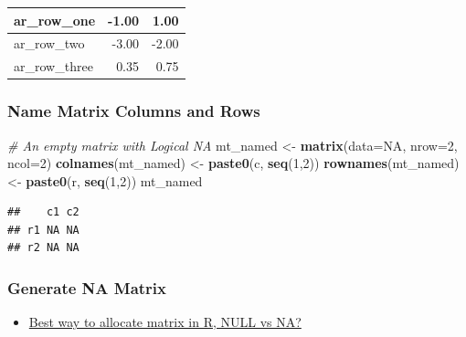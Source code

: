 \documentclass[
]{book}
\newenvironment{Shaded}{\begin{snugshade}}{\end{snugshade}}
\newcommand{\CommentTok}[1]{\textcolor[rgb]{0.56,0.35,0.01}{\textit{#1}}}
\newcommand{\DataTypeTok}[1]{\textcolor[rgb]{0.13,0.29,0.53}{#1}}
\newcommand{\DecValTok}[1]{\textcolor[rgb]{0.00,0.00,0.81}{#1}}
\newcommand{\KeywordTok}[1]{\textcolor[rgb]{0.13,0.29,0.53}{\textbf{#1}}}
\newcommand{\NormalTok}[1]{#1}
\newcommand{\OtherTok}[1]{\textcolor[rgb]{0.56,0.35,0.01}{#1}}
\newcommand{\StringTok}[1]{\textcolor[rgb]{0.31,0.60,0.02}{#1}}
\providecommand{\tightlist}{%
  \setlength{\itemsep}{0pt}\setlength{\parskip}{0pt}}
\begin{document}
\begin{table}[!h]
\centering
\begin{tabular}{l|r|r}
\hline
ar\_row\_one & -1.00 & 1.00\\
\hline
\rowcolor{gray!6}  ar\_row\_two & -3.00 & -2.00\\
\hline
ar\_row\_three & 0.35 & 0.75\\
\hline
\end{tabular}
\end{table}

\hypertarget{name-matrix-columns-and-rows}{%
\subsubsection{Name Matrix Columns and Rows}\label{name-matrix-columns-and-rows}}

\begin{Shaded}
\begin{Highlighting}[]
\CommentTok{\# An empty matrix with Logical NA}
\NormalTok{mt\_named \textless{}{-}}\StringTok{ }\KeywordTok{matrix}\NormalTok{(}\DataTypeTok{data=}\OtherTok{NA}\NormalTok{, }\DataTypeTok{nrow=}\DecValTok{2}\NormalTok{, }\DataTypeTok{ncol=}\DecValTok{2}\NormalTok{)}
\KeywordTok{colnames}\NormalTok{(mt\_named) \textless{}{-}}\StringTok{ }\KeywordTok{paste0}\NormalTok{(}\StringTok{\textquotesingle{}c\textquotesingle{}}\NormalTok{, }\KeywordTok{seq}\NormalTok{(}\DecValTok{1}\NormalTok{,}\DecValTok{2}\NormalTok{))}
\KeywordTok{rownames}\NormalTok{(mt\_named) \textless{}{-}}\StringTok{ }\KeywordTok{paste0}\NormalTok{(}\StringTok{\textquotesingle{}r\textquotesingle{}}\NormalTok{, }\KeywordTok{seq}\NormalTok{(}\DecValTok{1}\NormalTok{,}\DecValTok{2}\NormalTok{))}
\NormalTok{mt\_named}
\end{Highlighting}
\end{Shaded}

\begin{verbatim}
##    c1 c2
## r1 NA NA
## r2 NA NA
\end{verbatim}

\hypertarget{generate-na-matrix}{%
\subsubsection{Generate NA Matrix}\label{generate-na-matrix}}

\begin{itemize}
\tightlist
\item
  \href{https://stackoverflow.com/a/26724451/8280804}{Best way to allocate matrix in R, NULL vs NA?}
\end{itemize}
\end{document}
